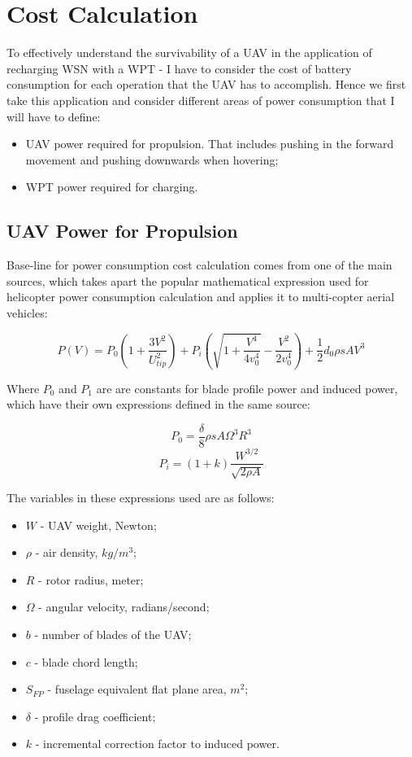 \documentclass[11pt,a4paper,footinclude=true,headinclude=true, oneside]{scrbook}
\begin{document}
\section{Cost Calculation}

To effectively understand the survivability of a UAV in the application of recharging WSN with a WPT - I have to consider the cost of battery consumption for each operation that the UAV has to accomplish. Hence we first take this application and consider different areas of power consumption that I will have to define:
\begin{itemize}
  \item UAV power required for propulsion. That includes pushing in the forward movement and pushing downwards when hovering;
  \item WPT power required for charging.
\end{itemize}

\subsection{UAV Power for Propulsion}

Base-line for power consumption cost calculation comes from one of the main sources\cite{zeng2019energy}, which takes apart the popular mathematical expression used for helicopter power consumption calculation and applies it to multi-copter aerial vehicles:

\[ P(V) = P_0  \left( 1 + \frac{3V^2}{U_{tip}^2} \right) 
    + P_i \left( \sqrt{1 + \frac{V^4}{4v_0^4}} - \frac{V^2}{2v_0^4} \right)
    + \frac{1}{2} d_0\rho sAV^3 \]

Where \(P_0\) and \(P_1\) are are constants for blade profile power and induced power, which have their own expressions defined in the same source:

\[ P_0 = \frac{\delta}{8} \rho sA\Omega^3R^3 \]
\[ P_i = (1 + k) \frac{W^{3/2}}{\sqrt{2\rho A}} \]

The variables in these expressions used are as follows:

\begin{itemize}
    \item \(W\) - UAV weight, Newton;
    \item \(\rho\) - air density, \(kg/m^3\);
    \item \(R\) - rotor radius, meter;
    \item \(\Omega\) - angular velocity, radians/second;
    \item \(b\) - number of blades of the UAV;
    \item \(c\) - blade chord length;
    \item \(S_{FP}\) - fuselage equivalent flat plane area, \(m^2\);
    \item \(\delta\) - profile drag coefficient;
    \item \(k\) - incremental correction factor to induced power.
\end{itemize}
\end{document}
